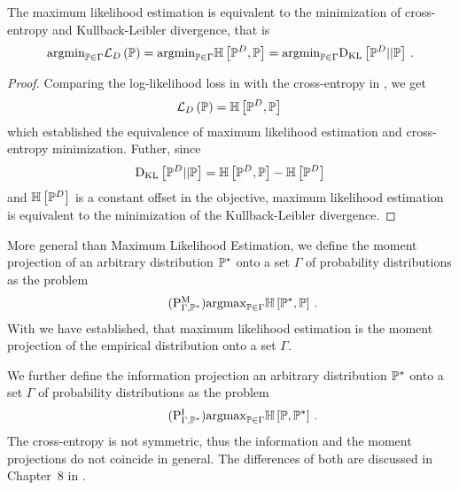 \begin{lemma}
    \label{lem:centropyMLE}
    The maximum likelihood estimation  is equivalent to the minimization of cross-entropy and Kullback-Leibler divergence, that is
    \begin{align*}
        \mathrm{argmin}_{\mathbb{P}\in\Gamma} \mathcal{L}_{D}\left(\mathbb{P}\right)
        = \mathrm{argmin}_{\mathbb{P}\in\Gamma} \mathbb{H}\left[\mathbb{P}^{D},\mathbb{P}\right]
        = \mathrm{argmin}_{\mathbb{P}\in\Gamma} \mathrm{D}_{\mathrm{KL}}\left[ \mathbb{P}^{D} || \mathbb{P} \right] \, .
    \end{align*}
\end{lemma}
\begin{proof}
    Comparing the log-likelihood loss in  with the cross-entropy in , we get
    \begin{align*}
        \mathcal{L}_{D}\left(\mathbb{P}\right) = \mathbb{H}\left[\mathbb{P}^{D},\mathbb{P}\right] \,
    \end{align*}
    which established the equivalence of maximum likelihood estimation and cross-entropy minimization.
    Futher, since
    \begin{align*}
        \mathrm{D}_{\mathrm{KL}}\left[ \mathbb{P}^{D} || \mathbb{P} \right] = \mathbb{H}\left[\mathbb{P}^{D},\mathbb{P}\right] - \mathbb{H}\left[\mathbb{P}^{D}\right]
    \end{align*}
    and $\mathbb{H}\left[\mathbb{P}^{D}\right]$ is a constant offset in the objective, maximum likelihood estimation is equivalent to the minimization of the Kullback-Leibler divergence.
\end{proof}

More general than Maximum Likelihood Estimation, we define the moment projection of an arbitrary distribution $\mathbb{P}^*$ onto a set $\Gamma$ of probability distributions as the problem
\begin{align}
    \tag{$\probtagtypeinst{\mathrm{M}}{\Gamma,\gendistribution}$}\label{prob:mProjection}
    \argmax_{\probtensorin} \centropyof{\gendistribution}{\probtensor} \, .
\end{align}
With  we have established, that maximum likelihood estimation is the moment projection of the empirical distribution onto a set $\Gamma$.

We further define the information projection an arbitrary distribution $\mathbb{P}^*$ onto a set $\Gamma$ of probability distributions as the problem
\begin{align}
    \tag{$\probtagtypeinst{\mathrm{I}}{\Gamma,\gendistribution}$}\label{prob:iProjection}
    \argmax_{\probtensorin} \centropyof{\probtensor}{\gendistribution} \, .
\end{align}
The cross-entropy is not symmetric, thus the information and the moment projections do not coincide in general.
The differences of both are discussed in Chapter~8 in \cite{koller_probabilistic_2009}.

